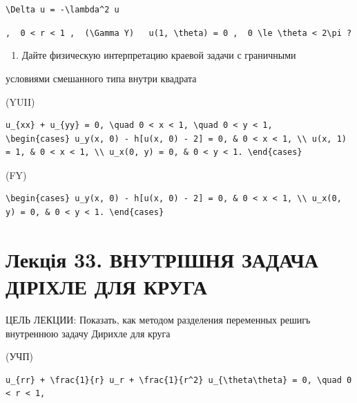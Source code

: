 \documentclass[
  ukrainian,
]{article}
\providecommand{\tightlist}{%
  \setlength{\itemsep}{0pt}\setlength{\parskip}{0pt}}
\begin{document}
\texttt{\textbackslash{}Delta\ u\ =\ -\textbackslash{}lambda\^{}2\ u}

\texttt{,\ \ \textquotesingle{}0\ \textless{}\ r\ \textless{}\ 1\textquotesingle{}\ ,\ \ \textquotesingle{}(\textbackslash{}Gamma\ Y)\textquotesingle{}\ \ \ \textquotesingle{}u(1,\ \textbackslash{}theta)\ =\ 0\textquotesingle{}\ ,\ \ \textquotesingle{}0\ \textbackslash{}le\ \textbackslash{}theta\ \textless{}\ 2\textbackslash{}pi\textquotesingle{}\ ?}

\begin{enumerate}
\def\labelenumi{\arabic{enumi}.}
\setcounter{enumi}{5}
\tightlist
\item
  Дайте физическую интерпретацию краевой задачи с граничными
\end{enumerate}

условиями смешанного типа внутри квадрата

(YUII)

\begin{verbatim}
u_{xx} + u_{yy} = 0, \quad 0 < x < 1, \quad 0 < y < 1,
\begin{cases} u_y(x, 0) - h[u(x, 0) - 2] = 0, & 0 < x < 1, \\ u(x, 1) = 1, & 0 < x < 1, \\ u_x(0, y) = 0, & 0 < y < 1. \end{cases}
\end{verbatim}

(FY)

\begin{verbatim}
\begin{cases} u_y(x, 0) - h[u(x, 0) - 2] = 0, & 0 < x < 1, \\ u_x(0, y) = 0, & 0 < y < 1. \end{cases}
\end{verbatim}

\section{Лекція 33. ВНУТРІШНЯ ЗАДАЧА ДІРІХЛЕ ДЛЯ
КРУГА}\label{ux43bux435ux43aux446ux456ux44f-33.-ux432ux43dux443ux442ux440ux456ux448ux43dux44f-ux437ux430ux434ux430ux447ux430-ux434ux456ux440ux456ux445ux43bux435-ux434ux43bux44f-ux43aux440ux443ux433ux430}

ЦЕЛЬ ЛЕКЦИИ: Показать, как методом разделения переменных решигь
внутреннюю задачу Дирихле для круга

(УЧП)

\begin{verbatim}
u_{rr} + \frac{1}{r} u_r + \frac{1}{r^2} u_{\theta\theta} = 0, \quad 0 < r < 1,
\end{verbatim}
\end{document}
